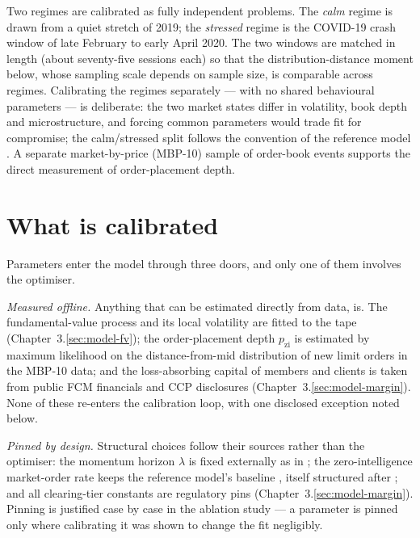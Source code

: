 Two regimes are calibrated as fully independent problems. The \emph{calm} regime
is drawn from a quiet stretch of 2019; the \emph{stressed} regime is the
COVID-19 crash window of late February to early April 2020. The two windows are
matched in length (about seventy-five sessions each) so that the
distribution-distance moment below, whose sampling scale depends on sample size,
is comparable across regimes. Calibrating the regimes separately --- with no
shared behavioural parameters --- is deliberate: the two market states differ in
volatility, book depth and microstructure, and forcing common parameters would
trade fit for compromise; the calm/stressed split follows the convention of the
reference model \citep{simudyne_odd}. A separate market-by-price (MBP-10) sample
of order-book events supports the direct measurement of order-placement depth.



\section{What is calibrated}
\label{sec:cal-split}

Parameters enter the model through three doors, and only one of them involves
the optimiser.

\emph{Measured offline.} Anything that can be estimated directly from data, is.
The fundamental-value process and its local volatility are fitted to the tape
(Chapter~3.\ref{sec:model-fv}); the order-placement depth $p_{\mathrm{zi}}$ is
estimated by maximum likelihood on the distance-from-mid distribution of new
limit orders in the MBP-10 data; and the loss-absorbing capital of members and
clients is taken from public FCM financials and CCP disclosures
(Chapter~3.\ref{sec:model-margin}). None of these re-enters the calibration
loop, with one disclosed exception noted below.

\emph{Pinned by design.} Structural choices follow their sources rather than the
optimiser: the momentum horizon $\lambda$ is fixed externally as in
\citet{majewski_2018}; the zero-intelligence market-order rate keeps the
reference model's baseline \citep{simudyne_odd}, itself structured after
\citet{cont_stoikov_talreja_2008}; and all clearing-tier constants are regulatory
pins (Chapter~3.\ref{sec:model-margin}). Pinning is justified case by case in the
ablation study --- a parameter is pinned only where calibrating it was shown to
change the fit negligibly.

